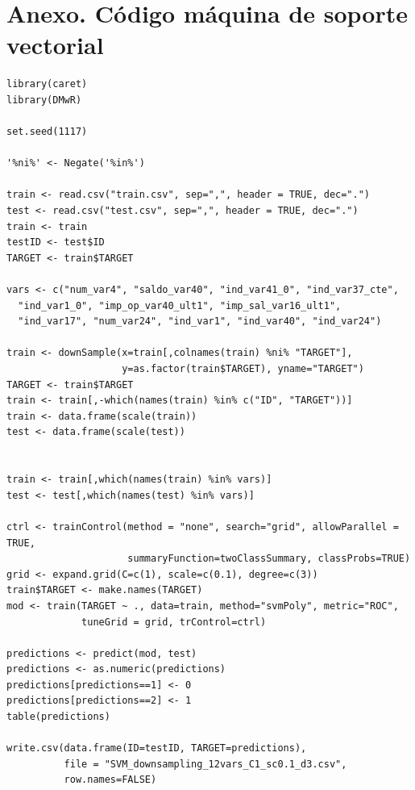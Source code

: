 \documentclass[11pt,a4paper,spanish]{article} %
\begin{document}
\section{Anexo. Código máquina de soporte vectorial}
{\scriptsize
\begin{verbatim}
library(caret)
library(DMwR)

set.seed(1117)

'%ni%' <- Negate('%in%') 

train <- read.csv("train.csv", sep=",", header = TRUE, dec=".")
test <- read.csv("test.csv", sep=",", header = TRUE, dec=".")
train <- train
testID <- test$ID
TARGET <- train$TARGET

vars <- c("num_var4", "saldo_var40", "ind_var41_0", "ind_var37_cte", 
  "ind_var1_0", "imp_op_var40_ult1", "imp_sal_var16_ult1", 
  "ind_var17", "num_var24", "ind_var1", "ind_var40", "ind_var24")

train <- downSample(x=train[,colnames(train) %ni% "TARGET"], 
                    y=as.factor(train$TARGET), yname="TARGET")
TARGET <- train$TARGET
train <- train[,-which(names(train) %in% c("ID", "TARGET"))]
train <- data.frame(scale(train))
test <- data.frame(scale(test))


train <- train[,which(names(train) %in% vars)]
test <- test[,which(names(test) %in% vars)]

ctrl <- trainControl(method = "none", search="grid", allowParallel = TRUE, 
                     summaryFunction=twoClassSummary, classProbs=TRUE)
grid <- expand.grid(C=c(1), scale=c(0.1), degree=c(3))
train$TARGET <- make.names(TARGET)
mod <- train(TARGET ~ ., data=train, method="svmPoly", metric="ROC", 
             tuneGrid = grid, trControl=ctrl)

predictions <- predict(mod, test)
predictions <- as.numeric(predictions)
predictions[predictions==1] <- 0
predictions[predictions==2] <- 1
table(predictions)

write.csv(data.frame(ID=testID, TARGET=predictions), 
          file = "SVM_downsampling_12vars_C1_sc0.1_d3.csv",
          row.names=FALSE)
\end{verbatim}
}
\newpage
\end{document}

